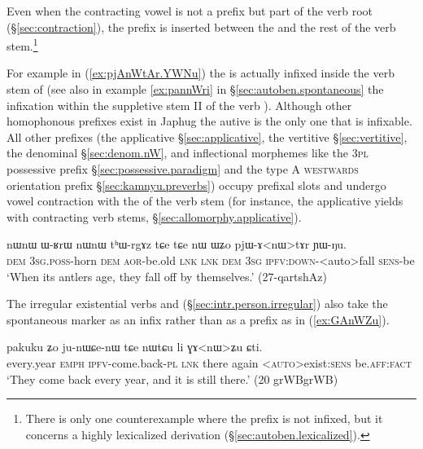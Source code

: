 Even when the contracting vowel  is not a prefix but part of the verb root (§\ref{sec:contraction}), the  prefix is inserted between the  and the rest of the verb stem.\footnote{There is only one counterexample where the  prefix is not infixed, but it concerns a highly lexicalized derivation (§\ref{sec:autoben.lexicalized}). }

For example in (\ref{ex:pjAnWtAr.YWNu}) the  is actually infixed inside the verb stem of  (see also in example \ref{ex:pannWri} in §\ref{sec:autoben.spontaneous} the infixation within the suppletive stem II  of the verb ).  Although other homophonous prefixes exist in Japhug the autive is the only one that is infixable. All other  prefixes (the applicative §\ref{sec:applicative}, the vertitive §\ref{sec:vertitive}, the denominal  §\ref{sec:denom.nW}, and inflectional morphemes like the \textsc{3pl} possessive prefix §\ref{sec:possessive.paradigm} and the type A \textsc{westwards} orientation prefix §\ref{sec:kamnyu.preverbs}) occupy prefixal slots and undergo vowel contraction with the  of the verb stem (for instance, the applicative yields  with contracting verb stems, §\ref{sec:allomorphy.applicative}).
 
 \begin{exe}
\ex \label{ex:pjAnWtAr.YWNu}
\gll nɯnɯ ɯ-ʁrɯ nɯnɯ tʰɯ-rgɤz tɕe tɕe nɯ ɯʑo pjɯ-ɤ<nɯ>tɤr ɲɯ-ŋu.  \\
\textsc{dem} \textsc{3sg}.\textsc{poss}-horn \textsc{dem} \textsc{aor}-be.old \textsc{lnk}   \textsc{lnk} \textsc{dem} \textsc{3sg} \textsc{ipfv}:\textsc{down}-<auto>fall \textsc{sens}-be \\
\glt `When its antlers age, they fall off by themselves.' (27-qartshAz)
\end{exe}


The irregular existential verbs  and  (§\ref{sec:intr.person.irregular}) also take  the spontaneous marker as an infix rather than as a prefix as in (\ref{ex:GAnWZu}). 

\begin{exe}
\ex \label{ex:GAnWZu}
\gll pakuku ʑo ju-nɯɕe-nɯ tɕe nɯtɕu li ɣɤ<nɯ>ʑu ɕti. 	\\
 every.year \textsc{emph} \textsc{ipfv}-come.back-\textsc{pl} \textsc{lnk} there again <\textsc{auto}>exist:\textsc{sens} be.\textsc{aff}:\textsc{fact} \\
 \glt `They come back every year, and it is still there.' (20 grWBgrWB)
\end{exe}

